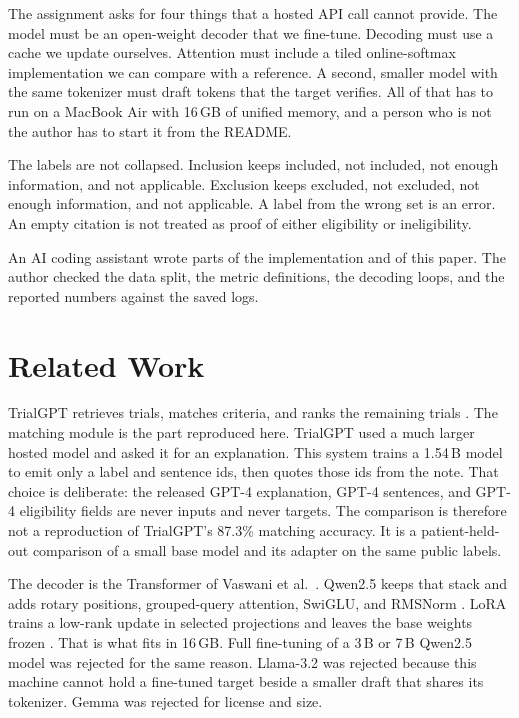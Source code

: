\documentclass[conference]{IEEEtran}
\begin{document}
The assignment asks for four things that a hosted API call cannot provide.
The model must be an open-weight decoder that we fine-tune.
Decoding must use a cache we update ourselves.
Attention must include a tiled online-softmax implementation we can compare with a reference.
A second, smaller model with the same tokenizer must draft tokens that the target verifies.
All of that has to run on a MacBook Air with 16\,GB of unified memory, and a person who is not the author has to start it from the README.

The labels are not collapsed.
Inclusion keeps included, not included, not enough information, and not applicable.
Exclusion keeps excluded, not excluded, not enough information, and not applicable.
A label from the wrong set is an error.
An empty citation is not treated as proof of either eligibility or ineligibility.

An AI coding assistant wrote parts of the implementation and of this paper.
The author checked the data split, the metric definitions, the decoding loops, and the reported numbers against the saved logs.

\section{Related Work}
TrialGPT retrieves trials, matches criteria, and ranks the remaining trials \cite{jin2024trialgpt}.
The matching module is the part reproduced here.
TrialGPT used a much larger hosted model and asked it for an explanation.
This system trains a 1.54\,B model to emit only a label and sentence ids, then quotes those ids from the note.
That choice is deliberate: the released GPT-4 explanation, GPT-4 sentences, and GPT-4 eligibility fields are never inputs and never targets.
The comparison is therefore not a reproduction of TrialGPT's 87.3\% matching accuracy.
It is a patient-held-out comparison of a small base model and its adapter on the same public labels.

The decoder is the Transformer of Vaswani et al.\ \cite{vaswani2017attention}.
Qwen2.5 keeps that stack and adds rotary positions, grouped-query attention, SwiGLU, and RMSNorm \cite{qwen2025}.
LoRA trains a low-rank update in selected projections and leaves the base weights frozen \cite{hu2022lora}.
That is what fits in 16\,GB.
Full fine-tuning of a 3\,B or 7\,B Qwen2.5 model was rejected for the same reason.
Llama-3.2 was rejected because this machine cannot hold a fine-tuned target beside a smaller draft that shares its tokenizer.
Gemma was rejected for license and size.
\end{document}
